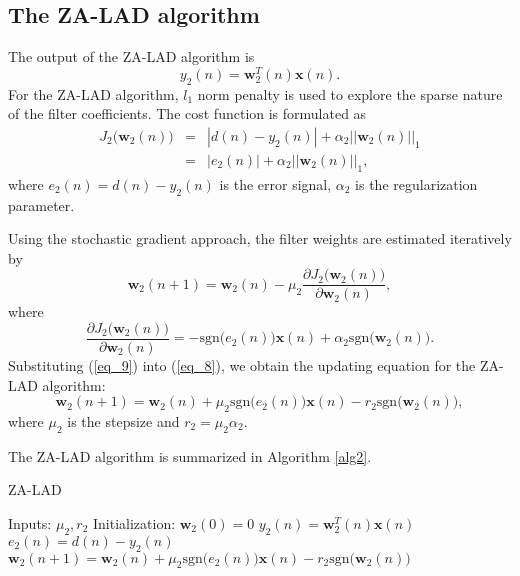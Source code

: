 \documentclass[conference]{IEEEtran}
\begin{document}
\subsection {The ZA-LAD algorithm}
\label{S2-2}
The output of the ZA-LAD algorithm is 
\begin{equation}
\label{eq_6}
y_2(n) = \mathbf{w}_2^T(n)\mathbf{x}(n).
\end{equation}
For the ZA-LAD algorithm, $l_1$ norm penalty is used to explore the sparse nature of the filter coefficients. The cost function is formulated as
\setlength\arraycolsep{0.1em}
\begin{eqnarray}
\label{eq_7}
J_2\big(\mathbf{w}_2(n)\big)  &=&   \left|d(n) - y_2(n)  \right|  + \alpha_2 \left|\left|\mathbf{w}_2(n)\right|\right|_1 \nonumber\\
&=&   \left| e_2(n) \right|  + \alpha_2\left|\left|\mathbf{w}_2(n)\right|\right|_1,
\end{eqnarray}
where $e_2(n) = d(n) - y_2(n)$ is the error signal, $\alpha_2$ is the regularization parameter.

Using the stochastic gradient approach, the filter weights are estimated iteratively by
\begin{equation}
\label{eq_8}
\mathbf{w}_2(n+1)=\mathbf{w}_2(n) - \mu_2\frac{ \partial J_2\big(\mathbf{w}_2(n)\big)}{ \partial \mathbf{w}_2(n)},
\end{equation}
where 
\begin{equation}
\label{eq_9}
\frac{ \partial J_2\big(\mathbf{w}_2(n)\big)}{ \partial \mathbf{w}_2(n)} = -\textrm{sgn} \big(e_2(n)\big)\mathbf{x}(n)  + \alpha_2  \textrm{sgn}  \big(\mathbf{w}_2(n)\big).
\end{equation}
Substituting (\ref{eq_9}) into (\ref{eq_8}), we obtain the updating equation for the ZA-LAD algorithm:
\begin{equation}
\label{eq_10}
\mathbf{w}_2(n+1)=\mathbf{w}_2(n)+ \mu_2 \textrm{sgn} \big(e_2(n)\big)\mathbf{x}(n)  - r_2  \textrm{sgn}  \big(\mathbf{w}_2(n)\big),
\end{equation}
where $\mu_2$ is the stepsize and $r_2=\mu_2\alpha_2$.

The ZA-LAD algorithm is summarized in Algorithm \ref{alg2}.
\begin{algorithm}[!h]
\caption{ZA-LAD}
\label{alg2}
\begin{algorithmic}
\STATE   Inputs:  $ \mu_2,  r_2$
\STATE  Initialization:  $\mathbf{w}_2(0)=0$
\STATE $y_2(n)  =  \mathbf{w}^T_2(n)\mathbf{x}(n)$
\STATE $e_2(n)  = d(n) - y_2(n)$
\STATE $\mathbf{w}_2(n+1) = \mathbf{w}_2(n)+\mu_2\textrm{sgn}\big(e_2(n)\big)\mathbf{x}(n)-r_2\textrm{sgn}\big(\mathbf{w}_2(n)\big) $
\ENDFOR
\end{algorithmic}
\end{algorithm}
\end{document}

